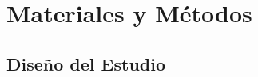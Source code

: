 %
%
%
%
%
%
%

\chapter{Materiales y Métodos}
\label{cap:metodologia}

\section{Diseño del Estudio}
\label{sec:diseño_estudio}


